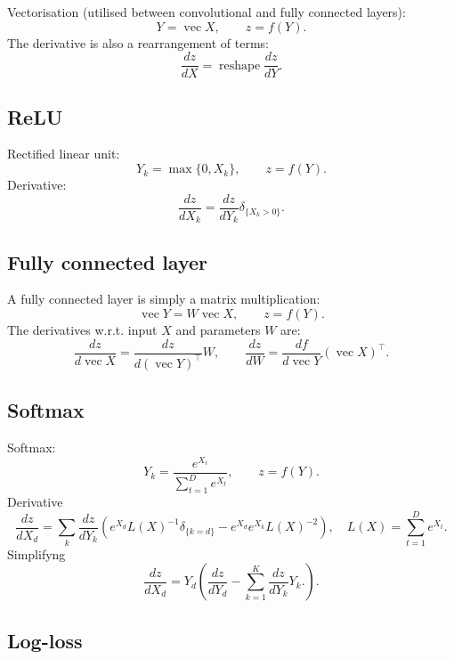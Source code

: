 \documentclass[12pt]{article}
\newcommand{\vv}{\operatorname{vec}}
\begin{document}
Vectorisation (utilised between convolutional and fully connected layers):
\[
 Y = \vv X, \qquad z = f(Y).
\]
The derivative is also a rearrangement of terms:
\[
\frac{dz}{dX} = \operatorname{reshape} \frac{dz}{dY}.
\]


\subsection{ReLU}\label{s:relu}

Rectified linear unit:
\[
 Y_k = \max\{0, X_k\}, \qquad z = f(Y).
\]
Derivative:
\[
\frac{dz}{dX_k}
=
\frac{dz}{dY_k} \delta_{\{X_k > 0 \}}.
\]

\subsection{Fully connected layer}\label{s:fully}

A fully connected layer is simply a matrix multiplication:
\[
  \vv Y = W \vv X, \qquad z = f(Y).
\]
The derivatives w.r.t. input $X$ and parameters $W$ are:
\[
\frac{dz}{d\vv X}
= 
\frac{dz}{d(\vv Y)^\top} W,
\qquad
\frac{dz}{d W}
= 
\frac{df}{d \vv Y} (\vv X)^\top.
\]

\subsection{Softmax}\label{s:softmax}

Softmax:
\[
 Y_k = \frac{e^{X_i}}{\sum_{t=1}^D e^{X_t}}, \qquad z = f(Y).
\]
Derivative
\[
\frac{dz}{d X_d}
=
\sum_{k}
\frac{dz}{d Y_k}
\left(
e^{X_d} L(X)^{-1} \delta_{\{k=d\}}
-
e^{X_d}
e^{X_k} L(X)^{-2}
\right),
\quad
L(X) = \sum_{t=1}^D e^{X_t}.
\]
Simplifyng
\[
\frac{dz}{d X_d}
=
Y_d 
\left(
\frac{dz}{d Y_d}
-
\sum_{k=1}^K
\frac{dz}{d Y_k} Y_k.
\right).
\]

\subsection{Log-loss}\label{s:loss}
\end{document}
